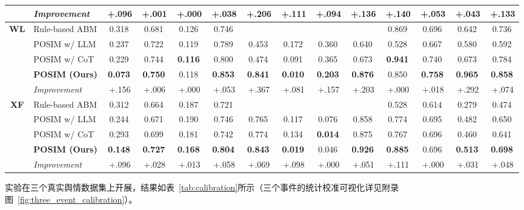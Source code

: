 \documentclass[a4paper,fleqn]{cas-dc}
\newcommand{\best}[1]{\textbf{#1}}
\newcommand{\na}{\text{---}}
\newcommand{\gain}[1]{{\textcolor{gaingreen}{\,#1}}}
\begin{document}
\begin{table}[!t]
{\begin{tabular}{@{}cl cccc cccc cccc@{}}
\rowcolor{oursrow}
& \textit{Improvement} & \gain{+.096} & \gain{+.001} & \gain{+.000} & \gain{+.038} & \gain{+.206} & \gain{+.111} & \gain{+.094} & \gain{+.136} & \gain{+.140} & \gain{+.053} & \gain{+.043} & \gain{+.133} \\
\midrule
\multirow{5}{*}{\textbf{WL}}
& Rule-based ABM        & 0.318 & 0.681 & 0.126 & 0.746 & \na & \na & \na & \na & 0.869 & 0.696 & 0.642 & 0.736 \\
& POSIM w/ LLM        & 0.237 & 0.722 & 0.119 & 0.789 & 0.453 & 0.172 & 0.360 & 0.640 & 0.528 & 0.667 & 0.580 & 0.592 \\
& POSIM w/ CoT          & 0.229 & 0.744 & \best{0.116} & 0.800 & 0.474 & 0.091 & 0.365 & 0.673 & \best{0.941} & 0.740 & 0.673 & 0.784 \\
\rowcolor{oursrow}
& \textbf{POSIM (Ours)}  & \best{0.073} & \best{0.750} & 0.118 & \best{0.853} & \best{0.841} & \best{0.010} & \best{0.203} & \best{0.876} & 0.850 & \best{0.758} & \best{0.965} & \best{0.858} \\[1pt]
\rowcolor{oursrow}
& \textit{Improvement} & \gain{+.156} & \gain{+.006} & \gain{+.000} & \gain{+.053} & \gain{+.367} & \gain{+.081} & \gain{+.157} & \gain{+.203} & \gain{+.000} & \gain{+.018} & \gain{+.292} & \gain{+.074} \\
\midrule
\multirow{5}{*}{\textbf{XF}}
& Rule-based ABM        & 0.312 & 0.664 & 0.187 & 0.721 & \na & \na & \na & \na & 0.528 & 0.614 & 0.279 & 0.474 \\
& POSIM w/ LLM        & 0.244 & 0.671 & 0.190 & 0.746 & 0.765 & 0.117 & 0.076 & 0.858 & 0.774 & 0.695 & 0.482 & 0.650 \\
& POSIM w/ CoT          & 0.293 & 0.699 & 0.181 & 0.742 & 0.774 & 0.134 & \best{0.014} & 0.875 & 0.767 & 0.696 & 0.460 & 0.641 \\
\rowcolor{oursrow}
& \textbf{POSIM (Ours)}  & \best{0.148} & \best{0.727} & \best{0.168} & \best{0.804} & \best{0.843} & \best{0.019} & 0.046 & \best{0.926} & \best{0.885} & 0.696 & \best{0.513} & \best{0.698} \\[1pt]
\rowcolor{oursrow}
& \textit{Improvement} & \gain{+.096} & \gain{+.028} & \gain{+.013} & \gain{+.058} & \gain{+.069} & \gain{+.098} & \gain{+.000} & \gain{+.051} & \gain{+.111} & \gain{+.000} & \gain{+.031} & \gain{+.048} \\
\bottomrule
\end{tabular}%
}
\end{table}

实验在三个真实舆情数据集上开展，结果如表~\ref{tab:calibration}所示（三个事件的统计校准可视化详见附录图~\ref{fig:three_event_calibration}）。
\end{document}
